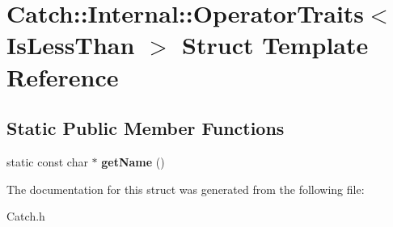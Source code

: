 \hypertarget{struct_catch_1_1_internal_1_1_operator_traits_3_01_is_less_than_01_4}{\section{Catch\-:\-:Internal\-:\-:Operator\-Traits$<$ Is\-Less\-Than $>$ Struct Template Reference}
\label{struct_catch_1_1_internal_1_1_operator_traits_3_01_is_less_than_01_4}
}
\subsection*{Static Public Member Functions}
\begin{DoxyCompactItemize}
\item 
\hypertarget{struct_catch_1_1_internal_1_1_operator_traits_3_01_is_less_than_01_4_aa3b536ddbd2e34b1253931ff00c32712}{static const char $\ast$ {\bfseries get\-Name} ()}\label{struct_catch_1_1_internal_1_1_operator_traits_3_01_is_less_than_01_4_aa3b536ddbd2e34b1253931ff00c32712}

\end{DoxyCompactItemize}


The documentation for this struct was generated from the following file\-:\begin{DoxyCompactItemize}
\item 
Catch.\-h\end{DoxyCompactItemize}
